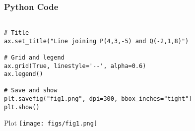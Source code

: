 \documentclass{beamer}
\begin{document}
\begin{frame}[fragile]
    \frametitle{Python Code}
    \begin{lstlisting}
    
# Title
ax.set_title("Line joining P(4,3,-5) and Q(-2,1,8)")

# Grid and legend
ax.grid(True, linestyle='--', alpha=0.6)
ax.legend()

# Save and show
plt.savefig("fig1.png", dpi=300, bbox_inches="tight")
plt.show()

    \end{lstlisting}
\end{frame}

\begin{frame}{Plot}
   \centering
   \texttt{[image: figs/fig1.png]}
   \label{fig:Beamer/figs/fig1.png}
\end{frame}
\end{document}
